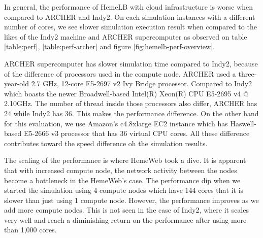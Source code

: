\vspace{1cm}


In general, the performance of HemeLB with cloud infrastructure is worse when compared to ARCHER and Indy2. On each simulation instances with a different number of cores, we see slower simulation execution result when compared to the likes of the Indy2 machine and ARCHER supercomputer as observed on table \ref{table:perf}, \ref{table:perf-archer} and figure \ref{fig:hemelb-perf-overview}.

ARCHER supercomputer has slower simulation time compared to Indy2, because of the difference of processors used in the compute node. ARCHER used a three-year-old 2.7 GHz, 12-core E5-2697 v2 Ivy Bridge processor. Compared to Indy2 which boasts the newer Broadwell-based Intel(R) Xeon(R) CPU E5-2695 v4 @ 2.10GHz. The number of thread inside those processors also differ, ARCHER has 24 while Indy2 has 36. This makes the performance difference. On the other hand for this evaluation, we use Amazon's c4.8xlarge EC2 instance which has Haswell-based E5-2666 v3 processor that has 36 virtual CPU cores. All these difference contributes toward the speed difference oh the simulation results.

The scaling of the performance is where HemeWeb took a dive. It is apparent that with increased compute node, the network activity between the nodes become a bottleneck in the HemeWeb's case. The performance dip when we started the simulation using 4 compute nodes which have 144 cores that it is slower than just using 1 compute node. However, the performance improves as we add more compute nodes. This is not seen in the case of Indy2, where it scales very well and reach a diminishing return on the performance after using more than 1,000 cores.